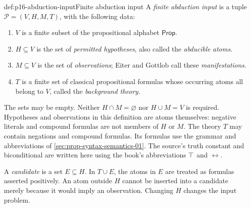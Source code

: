 \begin{hbdefinition}{def:p16-abduction-input}{Finite abduction input}
A \emph{finite abduction input} is a tuple
\(\mathcal P=(V,H,M,T)\), with the following data:
\begin{enumerate}
\item \(V\) is a finite subset of the propositional alphabet \(\mathsf{Prop}\).
\item \(H\subseteq V\) is the set of \emph{permitted hypotheses}, also
      called the \emph{abducible atoms}.
\item \(M\subseteq V\) is the set of \emph{observations}; Eiter and
      Gottlob call these \emph{manifestations}.
\item \(T\) is a finite set of classical propositional formulas whose
      occurring atoms all belong to \(V\), called the \emph{background
      theory}.
\end{enumerate}
The sets may be empty. Neither \(H\cap M=\varnothing\) nor
\(H\cup M=V\) is required. Hypotheses and observations in this definition
are atoms themselves: negative literals and compound formulas are not
members of \(H\) or \(M\). The theory \(T\) may contain negations
and compound formulas. Its formulas use the grammar and abbreviations of
\cref{sec:prop-syntax-semantics-01}.
The source's truth constant and biconditional are written here using
the book's abbreviations \(\top\) and \(\leftrightarrow\).

A \emph{candidate} is a set \(E\subseteq H\). In \(T\cup E\),
the atoms in \(E\) are treated as formulas asserted positively.
An atom outside \(H\) cannot be inserted into a candidate merely because
it would imply an observation. Changing \(H\) changes the input problem.
\end{hbdefinition}

